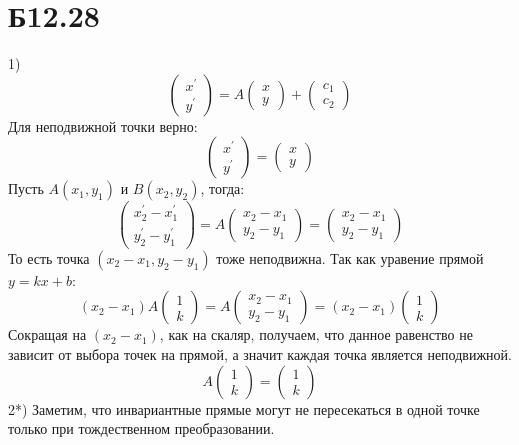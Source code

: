 \section*{Б12.28}
1)$$\begin{pmatrix*}
    x^{\prime}\\y^{\prime}
\end{pmatrix*}=A\begin{pmatrix*}
    x\\y
\end{pmatrix*}+\begin{pmatrix*}
    c_1\\c_2
\end{pmatrix*}$$
Для неподвижной точки верно:
$$\begin{pmatrix*}
    x^{\prime}\\y^{\prime}
\end{pmatrix*}=\begin{pmatrix*}
    x\\y
\end{pmatrix*}$$
Пусть $A(x_1,y_1)$ и $B(x_2,y_2)$, тогда:$$\begin{pmatrix*}
    x^{\prime}_2-x^{\prime}_1\\y^{\prime}_2-y^{\prime}_1
\end{pmatrix*}=A\begin{pmatrix*}
    x_2-x_1\\y_2-y_1
\end{pmatrix*}=\begin{pmatrix*}
    x_2-x_1\\y_2-y_1
\end{pmatrix*}$$
То есть точка $(x_2-x_1,y_2-y_1)$ тоже неподвижна. Так как уравение прямой $y=kx+b$:$$(x_2-x_1)A\begin{pmatrix*}
    1\\k
\end{pmatrix*}=A\begin{pmatrix*}
    x_2-x_1\\y_2-y_1
\end{pmatrix*}=(x_2-x_1)\begin{pmatrix*}
    1\\k
\end{pmatrix*}$$
Сокращая на $(x_2-x_1)$, как на скаляр, получаем, что данное равенство не зависит от выбора точек на прямой, а значит каждая точка является неподвижной.
$$A\begin{pmatrix*}
    1\\k
\end{pmatrix*}=\begin{pmatrix*}
    1\\k
\end{pmatrix*}$$
2*) Заметим, что инвариантные прямые могут не пересекаться в одной точке только при тождественном преобразовании.
